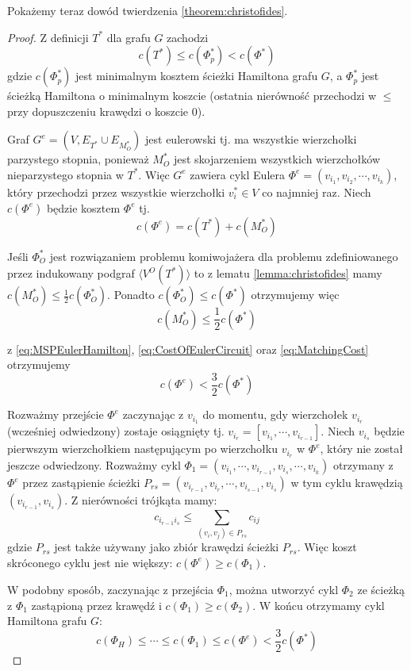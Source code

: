 \documentclass{article}
\theoremstyle{definition}
\theoremstyle{plain}
\theoremstyle{remark}
\begin{document}
\noindent
Pokażemy teraz dowód twierdzenia \ref{theorem:christofides}. 
\begin{proof}

Z definicji $T^*$ dla grafu $G$ zachodzi
\begin{equation} \label{eq:MSPEulerHamilton}
  c(T^*) \leq c(\Phi_p^*) < c(\Phi^*)
\end{equation}
gdzie $c(\Phi_p^*)$ jest minimalnym kosztem ścieżki Hamiltona grafu $G$, a $\Phi_p^*$ jest ścieżką Hamiltona o minimalnym koszcie (ostatnia nierówność przechodzi w $\leq$ przy dopuszczeniu krawędzi o koszcie $0$). 

Graf $G^e = (V, E_{T^*} \cup E_{M_O^*})$ jest eulerowski tj. ma wszystkie wierzchołki parzystego stopnia, ponieważ $M_O^*$ jest skojarzeniem wszystkich wierzchołków nieparzystego stopnia w $T^*$. Więc $G^e$ zawiera cykl Eulera $\Phi^e = (v_{i_1}, v_{i_2}, \cdots, v_{i_k})$, który przechodzi przez wszystkie wierzchołki $v_i^*\in V$ co najmniej raz. 
Niech $c(\Phi^e)$ będzie kosztem $\Phi^e$ tj.
\begin{equation} \label{eq:CostOfEulerCircuit}
  c(\Phi^e) = c(T^*) + c(M_O^*)
\end{equation}

Jeśli $\Phi_O^*$ jest rozwiązaniem problemu komiwojażera dla problemu zdefiniowanego przez indukowany podgraf $\langle V^O(T^*)\rangle$ to z lematu \ref{lemma:christofides} mamy $c(M_O^*) \leq \frac{1}{2}c(\Phi_O^*)$. Ponadto $c(\Phi_O^*) \leq c(\Phi^*)$ otrzymujemy więc 
\begin{equation} \label{eq:MatchingCost}
    c(M_O^*) \leq \frac{1}{2}c(\Phi^*)
\end{equation}

\noindent
z \ref{eq:MSPEulerHamilton}, \ref{eq:CostOfEulerCircuit} oraz \ref{eq:MatchingCost} otrzymujemy 
\[
  c(\Phi^e) < \frac{3}{2}c(\Phi^*)
\]

Rozważmy przejście $\Phi^e$ zaczynając z $v_{i_1}$ do momentu, gdy wierzchołek 
$v_{i_r}$ (wcześniej odwiedzony) zostaje osiągnięty
tj. $v_{i_r} = [v_{i_1}, \cdots, v_{i_{r - 1}}]$. Niech $v_{i_s}$ będzie pierwszym wierzchołkiem następującym po wierzchołku $v_{i_r}$ w $\Phi^e$, który nie został jeszcze odwiedzony. Rozważmy cykl $\Phi_1 = (v_{i_1}, \cdots, v_{i_{r - 1}}, v_{i_s}, \cdots, v_{i_k})$ otrzymany z $\Phi^e$ przez zastąpienie ścieżki $P_{rs} = (v_{i_{r - 1}}, v_{i_r}, \cdots, v_{i_{s - 1}}, v_{i_s})$ w tym cyklu krawędzią $(v_{i_{r - 1}}, v_{i_s})$. 
Z nierówności trójkąta mamy: 
\[
  c_{i_{r-1}i_{s}} \leq \displaystyle\sum_{(v_i, v_j) \in P_{rs}}c_{ij}
\]
gdzie $P_{rs}$ jest także używany jako zbiór krawędzi ścieżki $P_{rs}$. Więc koszt skróconego cyklu jest nie większy: $c(\Phi^e) \geq c(\Phi_1)$. 

W podobny sposób, zaczynając z przejścia $\Phi_1$, można utworzyć cykl $\Phi_2$ ze ścieżką z $\Phi_1$ zastąpioną przez krawędź i $c(\Phi_1) \geq c(\Phi_2)$. W końcu otrzymamy cykl Hamiltona grafu $G$: 
\[
  c(\Phi_H) \leq \cdots \leq c(\Phi_1) \leq c(\Phi^e) < \frac{3}{2}c(\Phi^*)
\]
\end{proof}
\end{document}
